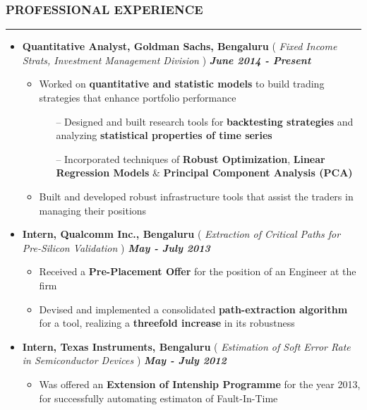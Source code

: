 \documentclass[10pt,a4paper,English]{article}
\newcommand\roottitle[1]{\vspace{-4mm}\subsubsection*{\uppercase{#1}}\vspace{-0.3em}\nopagebreak[4]\hrule}
\newcommand\itemyear[1]{\hfill \textbf{\emph{\color{itemyear} #1}}}
\newcommand\itemenv{\setlength\itemsep{0.5pt} \addtolength{\itemindent}{-5mm}\vspace{-1.5mm}}
\begin{document}
\roottitle{Professional Experience}
\vspace{4mm}
\begin{itemize} \itemenv
    \item \textbf{Quantitative Analyst, Goldman Sachs, Bengaluru} \hfill (\emph{ Fixed Income Strats, Investment Management Division }) \itemyear{June 2014 - Present}
        \begin{itemize} \itemenv 
            \item Worked on \textbf{quantitative and statistic models} to build trading strategies that enhance portfolio performance
            \begin{itemize} \itemenv \vspace{1mm}
                \item[--] Designed and built research tools for \textbf{backtesting strategies} and analyzing \textbf{statistical properties of time series}
                \item[--] Incorporated techniques of \textbf{Robust Optimization}, \textbf{Linear Regression Models} \& \textbf{Principal Component Analysis (PCA)} 
                \end{itemize}
            \item Built and developed robust infrastructure tools that assist the traders in managing their positions
        \end{itemize}
    \item \textbf{ Intern, Qualcomm Inc., Bengaluru } \hfill({\emph{ Extraction of Critical Paths for Pre-Silicon Validation }}) \itemyear{May - July 2013}
        \begin{itemize} \itemenv
            \item Received a \textbf{Pre-Placement Offer} for the position of an Engineer at the firm
            \item Devised and implemented a consolidated \textbf{path-extraction algorithm} for a tool, realizing a \textbf{threefold increase} in its robustness
        \end{itemize}
    \item \textbf{ Intern, Texas Instruments, Bengaluru } \hfill({\emph{ Estimation of Soft Error Rate in Semiconductor Devices }}) \itemyear{May - July 2012}
        \begin{itemize} \itemenv
            \item Was offered an \textbf{Extension of Intenship Programme} for the year 2013, for successfully automating estimaton of Fault-In-Time

\end{itemize}
\end{itemize}
\end{document}
